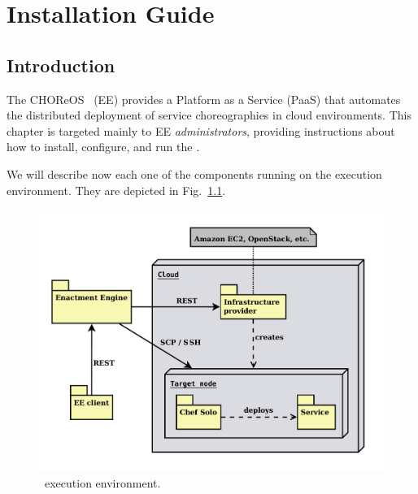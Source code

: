 
\chapter{Installation Guide}

\section{Introduction}

The CHOReOS \ee\ (EE) provides a Platform as a Service (PaaS) that automates the distributed deployment of service choreographies in cloud environments. This chapter is targeted mainly to EE \emph{administrators}, providing instructions about how to install, configure, and run the \ee.

We will describe now each one of the components running on the \ee execution environment. They are depicted in Fig.~\ref{fig:ee_components}. 

\begin{figure}
\centering
\includegraphics[scale=0.4]{img/components.pdf}
\caption{\ee\ execution environment.}
\label{fig:ee_components}
\end{figure}

